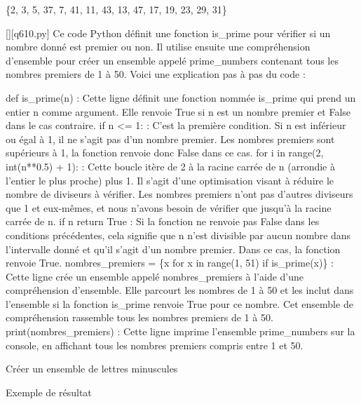 \{2, 3, 5, 37, 7, 41, 11, 43, 13, 47, 17, 19, 23, 29, 31\}
        \par
        \begin{solution}
            \renewcommand{\nomfichier}{q610.py}
            \pythonfile{\chemincode \nomfichier}[][\nomfichier]
            Ce code Python définit une fonction is\_prime pour vérifier si un nombre donné est premier ou non. Il utilise ensuite une compréhension d'ensemble pour créer un ensemble appelé prime\_numbers contenant tous les nombres premiers de 1 à 50. Voici une explication pas à pas du code :

    def is\_prime(n) : Cette ligne définit une fonction nommée is\_prime qui prend un entier n comme argument. Elle renvoie True si n est un nombre premier et False dans le cas contraire.
    if n <= 1: : C'est la première condition. Si n est inférieur ou égal à 1, il ne s'agit pas d'un nombre premier. Les nombres premiers sont supérieurs à 1, la fonction renvoie donc False dans ce cas.
    for i in range(2, int(n**0.5) + 1): : Cette boucle itère de 2 à la racine carrée de n (arrondie à l'entier le plus proche) plus 1. Il s'agit d'une optimisation visant à réduire le nombre de diviseurs à vérifier. Les nombres premiers n'ont pas d'autres diviseurs que 1 et eux-mêmes, et nous n'avons besoin de vérifier que jusqu'à la racine carrée de n.
    if n %
    return True : Si la fonction ne renvoie pas False dans les conditions précédentes, cela signifie que n n'est divisible par aucun nombre dans l'intervalle donné et qu'il s'agit d'un nombre premier. Dans ce cas, la fonction renvoie True.
    nombres\_premiers = \{x for x in range(1, 51) if is\_prime(x)\} : Cette ligne crée un ensemble appelé nombres\_premiers à l'aide d'une compréhension d'ensemble. Elle parcourt les nombres de 1 à 50 et les inclut dans l'ensemble si la fonction is\_prime renvoie True pour ce nombre. Cet ensemble de compréhension rassemble tous les nombres premiers de 1 à 50.
    print(nombres\_premiers) : Cette ligne imprime l'ensemble prime\_numbers sur la console, en affichant tous les nombres premiers compris entre 1 et 50.
        \end{solution}
        

        \question
        Créer un ensemble de lettres minuscules

Exemple de résultat

